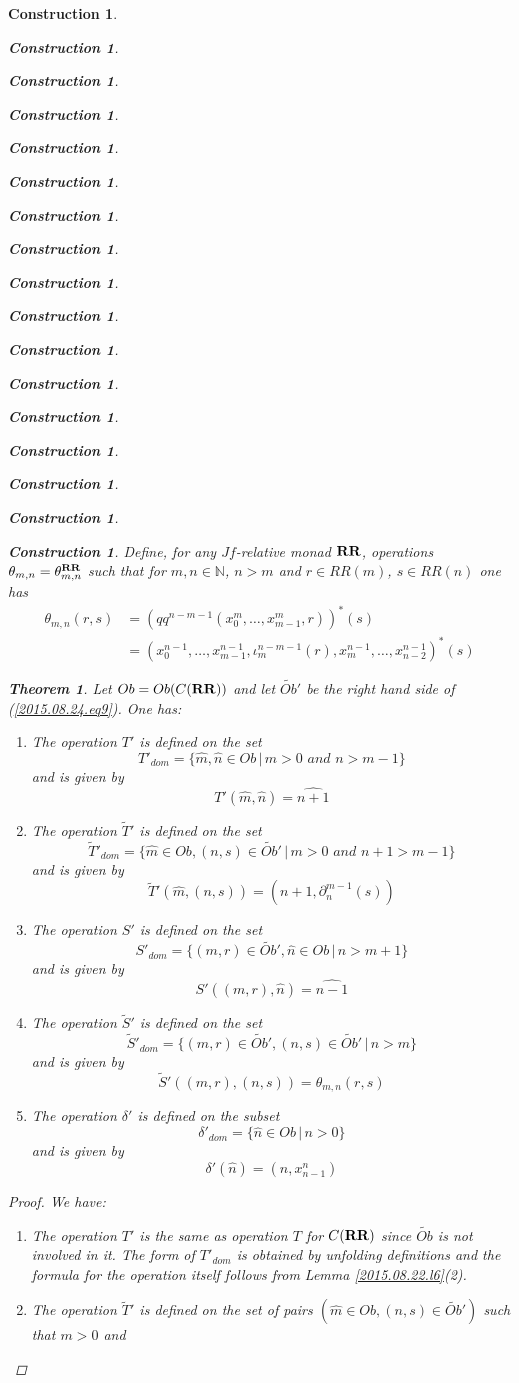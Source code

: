 \documentclass[12pt]{amsart}
\newtheorem{theorem}[proposition]{Theorem}
\numberwithin{proposition}{subsection}
\newtheorem{construction}[proposition]{Construction}
\newcommand{\llabel}[1]{\label{#1}}
\newcommand{\nn}{{\mathbb N}}
\newcommand{\nat}{\nn}
\newcommand{\wt}{\widetilde}
\newcommand{\wh}{\widehat}
\newcommand{\mbind}[1]{{#1^*}}
\newcommand{\RR}{{\bf RR}}
\begin{document}
\begin{construction}
\begin{construction}
\begin{construction}
\begin{construction}
\begin{construction}
\begin{construction}
\begin{construction}
\begin{construction}
\begin{construction}
\begin{construction}
\begin{construction}
\begin{construction}
\begin{construction}
\begin{construction}
\begin{construction}
\begin{construction}
\begin{construction}
Define, for any $Jf$-relative monad $\RR$, operations
$\theta_{m,n}=\theta^{\RR}_{m,n}$ such that for $m,n\in\nat$, $n>m$ and $r\in
RR(m)$, $s\in RR(n)$ one has
%
\begin{equation}
  \llabel{2015.09.07.eq1}
  \begin{split}
    \theta_{m,n}(r,s)&=\mbind{(qq^{n-m-1}(x_0^m,\dots,x_{m-1}^m,r))}(s) \\
    &=\mbind{(x_0^{n-1},\dots,x_{m-1}^{n-1},\iota_{m}^{n-m-1}(r),x_m^{n-1},\dots,x_{n-2}^{n-1})}(s)
  \end{split}
\end{equation}%
%
\begin{theorem}
\llabel{2015.08.26.th1}
Let $Ob=Ob(C(\RR))$ and let $\wt{Ob}'$ be the right hand side of (\ref{2015.08.24.eq9}). One has:
%
\begin{enumerate}
\item The operation $T'$ is defined on the set
%
$$T'_{dom}=\{\wh{m},\wh{n}\in Ob\,|\,m>0\,\,and\,\,n>m-1\}$$
%
and is given by 
%
$$T'(\wh{m},\wh{n})=\wh{n+1}$$
%
\item The operation $\wt{T}'$ is defined on the set 
%
$$\wt{T}'_{dom}=\{\wh{m}\in Ob, (n,s)\in \wt{Ob}'\,|\,m>0\,\,and\,\,n+1>m-1\}$$
%
and is given by
%
$$\wt{T}'(\wh{m},(n,s))=(n+1,\partial_n^{m-1}(s))$$
%
\item The operation $S'$ is defined on the set
%
$$S'_{dom}=\{(m,r)\in \wt{Ob}',\wh{n}\in Ob\,|\,n>m+1\}$$
%
and is given by
%
$$S'((m,r),\wh{n})=\wh{n-1}$$
%
\item The operation $\wt{S}'$ is defined on the set 
%
$$\wt{S}'_{dom}=\{(m,r)\in\wt{Ob}',(n,s)\in \wt{Ob}'\,|\,n>m\}$$
%
and is given by
%
$$\wt{S}'((m,r),(n,s))=\theta_{m,n}(r,s)$$
%
\item The operation $\delta'$ is defined on the subset
%
$$\delta'_{dom}=\{\wh{n}\in Ob\,|\,n>0\}$$
%
and is given by
%
$$\delta'(\wh{n})=(n,x_{n-1}^n)$$
%
\end{enumerate}
\end{theorem}
%
\begin{proof}
We have:
%
\begin{enumerate}
%
\item The operation $T'$ is the same as operation $T$ for $C(\RR)$ since $\wt{Ob}$
  is not involved in it. The form of $T'_{dom}$ is obtained by unfolding
  definitions and the formula for the operation itself follows from Lemma
  \ref{2015.08.22.l6}(2).
%
\item The operation $\wt{T}'$ is defined on the set of pairs $(\wh{m}\in Ob,
  (n,s)\in \wt{Ob}')$ such that $m>0$ and

\end{enumerate}
\end{proof}
\end{construction}
\end{construction}
\end{construction}
\end{construction}
\end{construction}
\end{construction}
\end{construction}
\end{construction}
\end{construction}
\end{construction}
\end{construction}
\end{construction}
\end{construction}
\end{construction}
\end{construction}
\end{construction}
\end{construction}
\end{document}
